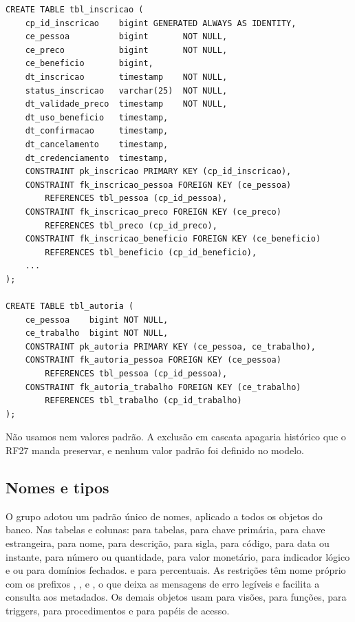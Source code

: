 \begin{lstlisting}
CREATE TABLE tbl_inscricao (
    cp_id_inscricao    bigint GENERATED ALWAYS AS IDENTITY,
    ce_pessoa          bigint       NOT NULL,
    ce_preco           bigint       NOT NULL,
    ce_beneficio       bigint,
    dt_inscricao       timestamp    NOT NULL,
    status_inscricao   varchar(25)  NOT NULL,
    dt_validade_preco  timestamp    NOT NULL,
    dt_uso_beneficio   timestamp,
    dt_confirmacao     timestamp,
    dt_cancelamento    timestamp,
    dt_credenciamento  timestamp,
    CONSTRAINT pk_inscricao PRIMARY KEY (cp_id_inscricao),
    CONSTRAINT fk_inscricao_pessoa FOREIGN KEY (ce_pessoa)
        REFERENCES tbl_pessoa (cp_id_pessoa),
    CONSTRAINT fk_inscricao_preco FOREIGN KEY (ce_preco)
        REFERENCES tbl_preco (cp_id_preco),
    CONSTRAINT fk_inscricao_beneficio FOREIGN KEY (ce_beneficio)
        REFERENCES tbl_beneficio (cp_id_beneficio),
    ...
);

CREATE TABLE tbl_autoria (
    ce_pessoa    bigint NOT NULL,
    ce_trabalho  bigint NOT NULL,
    CONSTRAINT pk_autoria PRIMARY KEY (ce_pessoa, ce_trabalho),
    CONSTRAINT fk_autoria_pessoa FOREIGN KEY (ce_pessoa)
        REFERENCES tbl_pessoa (cp_id_pessoa),
    CONSTRAINT fk_autoria_trabalho FOREIGN KEY (ce_trabalho)
        REFERENCES tbl_trabalho (cp_id_trabalho)
);
\end{lstlisting}

Não usamos  nem valores padrão. A exclusão em cascata apagaria histórico que o RF27 manda preservar, e nenhum valor padrão foi definido no modelo.

\subsection{Nomes e tipos}
\label{sec:nomes}

O grupo adotou um padrão único de nomes, aplicado a todos os objetos do banco. Nas tabelas e colunas:  para tabelas,  para chave primária,  para chave estrangeira,  para nome,  para descrição,  para sigla,  para código,  para data ou instante,  para número ou quantidade,  para valor monetário,  para indicador lógico e  ou  para domínios fechados. e  para percentuais. As restrições têm nome próprio com os prefixos , ,  e , o que deixa as mensagens de erro legíveis e facilita a consulta aos metadados. Os demais objetos usam  para visões,  para funções,  para triggers,  para procedimentos e  para papéis de acesso.

